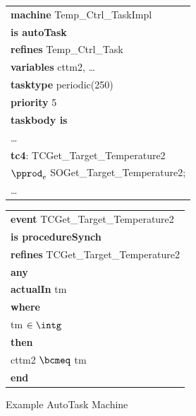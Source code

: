 \begin{figure}
\begin{sffamily}
\begin{minipage}{0.5\linewidth}
\begin{tabular}{l}
\textbf{machine} Temp\_Ctrl\_TaskImpl \\
\textbf{is autoTask}\\
\textbf{refines} Temp\_Ctrl\_Task\\
\textbf{variables} cttm2, \ldots
\\
\textbf{tasktype} periodic(250) \\
\textbf{priority}  5 \\
\textbf{taskbody is}\\ 
\quad \ldots\\
\quad\textbf{tc4}: TCGet\_Target\_Temperature2 \\
\qquad\quad $\pprod_e$ SOGet\_Target\_Temperature2;   \\
\quad\ldots\\
\end{tabular}
\end{minipage}
\begin{minipage}{0.5\linewidth}
\begin{tabular}{l}
\textbf{event} TCGet\_Target\_Temperature2\\
\textbf{is procedureSynch}\\
\textbf{refines} TCGet\_Target\_Temperature2 \\
\textbf{any}\\
\quad\textbf{actualIn} tm \\
\textbf{where}\\ 
\quad tm $\in \intg$ \\
\textbf{then}\\ 
\quad cttm2 $\bcmeq$ tm \\
\textbf{end}
\end{tabular}
\end{minipage}
\end{sffamily}
	\caption{Example AutoTask Machine}
	\label{fig:TaskingEventB}
\end{figure}
%
